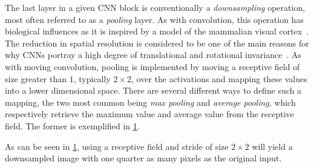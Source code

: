 The last layer in a given CNN block is conventionally a \textit{downsampling} operation, most often referred to as a \textit{pooling} layer.
As with convolution, this operation has biological influences as it is inspired by a model of the mammalian visual cortex~\cite[p.~966]{visint-cnn}.
The reduction in spatial resolution is considered to be one of the main reasons for why CNNs portray a high degree of translational and rotational invariance~\cite{cnn-translational-invariance}.
As with moving convolution, pooling is implemented by moving a receptive field of size greater than $1$, typically $2 \times 2$, over the activations and mapping these values into a lower dimensional space.
There are several different ways to define such a mapping, the two most common being \textit{max pooling} and \textit{average pooling}, which respectively retrieve the maximum value and average value from the receptive field.
The former is exemplified in \cref{fig:max-pooling}.

\begin{figure}[H]
  
  \label{fig:max-pooling}
\end{figure}

As can be seen in \cref{fig:max-pooling}, using a receptive field and stride of size $2 \times 2$ will yield a downsampled image with one quarter as many pixels as the original input.
